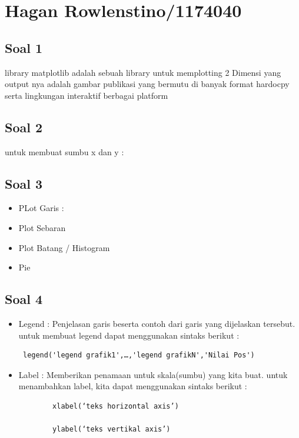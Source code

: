 \section{Hagan Rowlenstino/1174040}
	\subsection{Soal 1}
	library matplotlib adalah sebuah library untuk memplotting 2 Dimensi yang output nya adalah gambar publikasi yang bermutu di banyak format hardocpy serta lingkungan interaktif berbagai platform

	\subsection{Soal 2}
	untuk membuat sumbu x dan y :
	

	\subsection{Soal 3}
	\begin{itemize}
		\item PLot Garis :

		

		\item Plot Sebaran

		

		\item Plot Batang / Histogram

		

		\item Pie

		

	\end{itemize}

	\subsection{Soal 4}
	\begin{itemize}
		\item Legend : Penjelasan garis beserta contoh dari garis yang dijelaskan tersebut. untuk membuat legend dapat menggunakan sintaks berikut :

		\begin{verbatim} legend('legend grafik1',…,'legend grafikN','Nilai Pos') \end{verbatim}
		
		\item Label : Memberikan penamaan untuk skala(sumbu) yang kita buat. untuk menambahkan label, kita dapat menggunakan sintaks berikut :

		\begin{verbatim} 
		xlabel(‘teks horizontal axis’)

		ylabel(‘teks vertikal axis’)
		\end{verbatim}
	\end{itemize}


